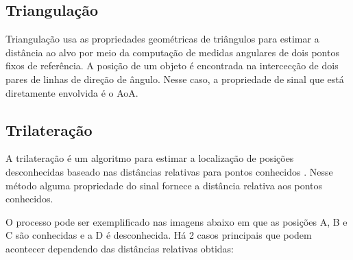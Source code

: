 \subsection{Triangulação}
Triangulação usa as propriedades geométricas de triângulos para estimar a distância ao alvo por meio da computação de medidas angulares de dois pontos fixos de referência.
A posição de um objeto é encontrada na intercecção de dois pares de linhas de direção de ângulo.
Nesse caso, a propriedade de sinal que está diretamente envolvida é o AoA.

\subsection{Trilateração}
\label{sec:trilateracao}

A trilateração é um algoritmo para estimar a localização de posições desconhecidas baseado nas distâncias relativas para pontos conhecidos \cite{art12}.
Nesse método alguma propriedade do sinal fornece a distância relativa aos pontos conhecidos.

O processo pode ser exemplificado nas imagens abaixo em que as posições A, B e C são conhecidas e a D é desconhecida. Há 2 casos principais que podem acontecer dependendo das distâncias relativas obtidas:

